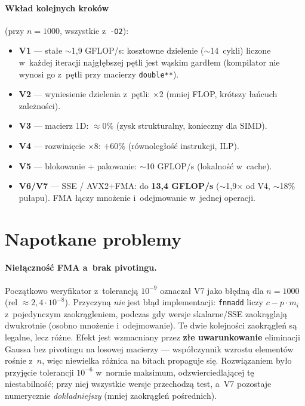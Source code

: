 \documentclass[11pt,a4paper]{article}
\begin{document}
\paragraph{Wkład kolejnych kroków} (przy $n=1000$, wszystkie z~\texttt{-O2}):
\begin{itemize}\itemsep1pt
  \item \textbf{V1} --- stałe $\sim$1{,}9 GFLOP/s: kosztowne dzielenie ($\sim$14~cykli) liczone
  w~każdej iteracji najgłębszej pętli jest wąskim gardłem (kompilator nie wynosi go z~pętli
  przy macierzy \texttt{double**}).
  \item \textbf{V2} --- wyniesienie dzielenia z~pętli: $\times$2 (mniej FLOP, krótszy łańcuch
  zależności).
  \item \textbf{V3} --- macierz 1D: $\approx$0\% (zysk strukturalny, konieczny dla SIMD).
  \item \textbf{V4} --- rozwinięcie $\times$8: $+60\%$ (równoległość instrukcji, ILP).
  \item \textbf{V5} --- blokowanie + pakowanie: $\sim$10 GFLOP/s (lokalność w~cache).
  \item \textbf{V6/V7} --- SSE / AVX2+FMA: do \textbf{13,4 GFLOP/s} ($\sim$1,9$\times$ od V4,
  $\sim$18\% pułapu). FMA łączy mnożenie i~odejmowanie w~jednej operacji.
\end{itemize}

\section{Napotkane problemy}
\label{sec:problemy}

\paragraph{Niełączność FMA a~brak pivotingu.} Początkowo weryfikator z~tolerancją $10^{-9}$
oznaczał V7 jako błędną dla $n=1000$ (rel $\approx 2{,}4\cdot10^{-8}$). Przyczyną \emph{nie}
jest błąd implementacji: \texttt{fnmadd} liczy $c-p\cdot m_i$ z~pojedynczym zaokrągleniem,
podczas gdy wersje skalarne/SSE zaokrąglają dwukrotnie (osobno mnożenie i~odejmowanie).
Te dwie kolejności zaokrągleń są legalne, lecz różne. Efekt jest wzmacniany przez
\textbf{złe uwarunkowanie} eliminacji Gaussa bez pivotingu na losowej macierzy ---
współczynnik wzrostu elementów rośnie z~$n$, więc niewielka różnica na bitach
propaguje się. Rozwiązaniem było przyjęcie tolerancji $10^{-6}$ w~normie maksimum,
odzwierciedlającej tę niestabilność; przy niej wszystkie wersje przechodzą test, a~V7
pozostaje numerycznie \emph{dokładniejszy} (mniej zaokrągleń pośrednich).
\end{document}
